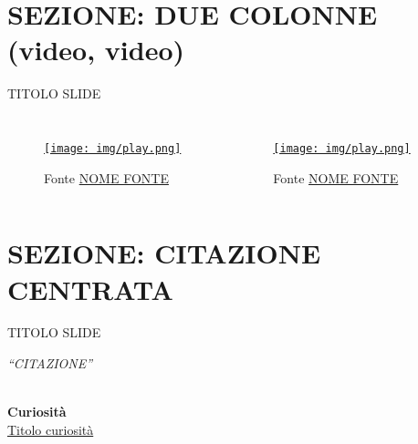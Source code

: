 \documentclass[aspectratio=1610]{beamer}
\begin{document}
\section{SEZIONE: DUE COLONNE (video, video)}

\begin{frame}{TITOLO SLIDE}
    \begin{columns}
            \begin{figure}
                \href{www.link.com}{\texttt{[image: img/play.png]}}
                \caption{{Fonte \href{www.link.com}{NOME FONTE}}}
            \end{figure}
            \begin{figure}
                \href{www.link.com}{\texttt{[image: img/play.png]}}
                \caption{{Fonte \href{www.link.com}{NOME FONTE}}}
            \end{figure}
    \end{columns}
\end{frame}

\section{SEZIONE: CITAZIONE CENTRATA}

\begin{frame}{TITOLO SLIDE}
    \begin{minipage}{0.98\linewidth}
        \centering
        \huge
        \textit{``CITAZIONE''}\\
    \end{minipage}\\
    \bigskip
    \tiny{\textbf{Curiosità}}\\
    \tiny{\href{www.link.com}{Titolo curiosità}}
\end{frame}
\end{document}
